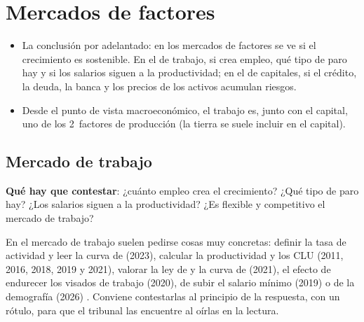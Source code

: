 \documentclass[11pt]{article}
\begin{document}
\section{Mercados de factores}\label{sec:factores}

\begin{itemize}
\item La conclusión por adelantado: en los mercados de factores se ve si el crecimiento es sostenible. En el de trabajo, si crea empleo, qué tipo de paro hay y si los salarios siguen a la productividad; en el de capitales, si el crédito, la deuda, la banca y los precios de los activos acumulan riesgos.
\item Desde el punto de vista macroeconómico, el trabajo es, junto con el capital, uno de los 2~factores de producción (la tierra se suele incluir en el capital).
\end{itemize}

\subsection{Mercado de trabajo}\label{sec:trabajo}

\begin{ideaclave}
\textbf{Qué hay que contestar}: ¿cuánto empleo crea el crecimiento? ¿Qué tipo de paro hay? ¿Los salarios siguen a la productividad? ¿Es flexible y competitivo el mercado de trabajo?
\end{ideaclave}

\begin{notaopositor}
En el mercado de trabajo suelen pedirse cosas muy concretas: definir la tasa de actividad y leer la curva de  (2023), calcular la productividad y los CLU (2011, 2016, 2018, 2019 y 2021), valorar la ley de  y la curva de  (2021), el efecto de endurecer los visados de trabajo (2020), de subir el salario mínimo (2019) o de la demografía (2026) \parencite{ATCEE2026Examenes}. Conviene contestarlas al principio de la respuesta, con un rótulo, para que el tribunal las encuentre al oírlas en la lectura.
\end{notaopositor}
\end{document}
